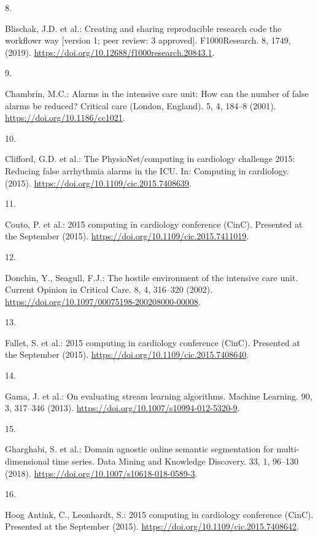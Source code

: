 \documentclass[
]{article}
\newlength{\cslhangindent}
\newlength{\csllabelwidth}
\newenvironment{CSLReferences}[2] %
 {%
  \setlength{\parindent}{0pt}
  \ifodd #1 \everypar{\setlength{\hangindent}{\cslhangindent}}\ignorespaces\fi
  \ifnum #2 > 0
  \setlength{\parskip}{#2\baselineskip}
  \fi
 }%
 {}
\newcommand{\CSLLeftMargin}[1]{\parbox[t]{\csllabelwidth}{#1}}
\newcommand{\CSLRightInline}[1]{\parbox[t]{\linewidth - \csllabelwidth}{#1}\break}
\begin{document}
\begin{CSLReferences}{0}{0}
\leavevmode{}%
\CSLLeftMargin{8. }
\CSLRightInline{Blischak, J.D. et al.: Creating and sharing reproducible
research code the workflowr way {[}version 1; peer review: 3
approved{]}. F1000Research. 8, 1749, (2019).
\url{https://doi.org/10.12688/f1000research.20843.1}.}

\leavevmode{}%
\CSLLeftMargin{9. }
\CSLRightInline{Chambrin, M.C.: Alarms in the intensive care unit: How
can the number of false alarms be reduced? Critical care (London,
England). 5, 4, 184--8 (2001). \url{https://doi.org/10.1186/cc1021}.}

\leavevmode{}%
\CSLLeftMargin{10. }
\CSLRightInline{Clifford, G.D. et al.: The PhysioNet/computing in
cardiology challenge 2015: Reducing false arrhythmia alarms in the ICU.
In: Computing in cardiology. (2015).
\url{https://doi.org/10.1109/cic.2015.7408639}.}

\leavevmode{}%
\CSLLeftMargin{11. }
\CSLRightInline{Couto, P. et al.: 2015 computing in cardiology
conference (CinC). Presented at the September (2015).
\url{https://doi.org/10.1109/cic.2015.7411019}.}

\leavevmode{}%
\CSLLeftMargin{12. }
\CSLRightInline{Donchin, Y., Seagull, F.J.: The hostile environment of
the intensive care unit. Current Opinion in Critical Care. 8, 4,
316--320 (2002).
\url{https://doi.org/10.1097/00075198-200208000-00008}.}

\leavevmode{}%
\CSLLeftMargin{13. }
\CSLRightInline{Fallet, S. et al.: 2015 computing in cardiology
conference (CinC). Presented at the September (2015).
\url{https://doi.org/10.1109/cic.2015.7408640}.}

\leavevmode{}%
\CSLLeftMargin{14. }
\CSLRightInline{Gama, J. et al.: {On evaluating stream learning
algorithms}. Machine Learning. 90, 3, 317--346 (2013).
\url{https://doi.org/10.1007/s10994-012-5320-9}.}

\leavevmode{}%
\CSLLeftMargin{15. }
\CSLRightInline{Gharghabi, S. et al.: Domain agnostic online semantic
segmentation for multi-dimensional time series. Data Mining and
Knowledge Discovery. 33, 1, 96--130 (2018).
\url{https://doi.org/10.1007/s10618-018-0589-3}.}

\leavevmode{}%
\CSLLeftMargin{16. }
\CSLRightInline{Hoog Antink, C., Leonhardt, S.: 2015 computing in
cardiology conference (CinC). Presented at the September (2015).
\url{https://doi.org/10.1109/cic.2015.7408642}.}


\end{CSLReferences}
\end{document}
